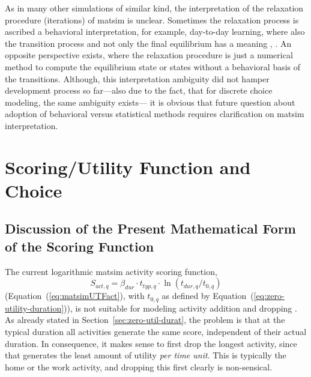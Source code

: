 As in many other simulations of similar kind, the interpretation of the relaxation procedure (iterations) of \gls{matsim} is unclear. 
%
Sometimes the relaxation process is ascribed a behavioral interpretation, for example, day-to-day learning, where also the transition process and not only the final equilibrium has a meaning \citep[][p.128]{LiuEtAl_TransResA_2006}, \citep[][p.523]{NagelBarrett1997feedback}. 
%
An opposite perspective exists, where the relaxation procedure is just a numerical method to compute the equilibrium state or states without a behavioral basis of the transitions.
%
Although, this interpretation ambiguity did not hamper development process so far---also due to the fact, that for discrete choice modeling, the same ambiguity exists---
it is obvious that future question about adoption of behavioral versus statistical methods 
requires clarification on \gls{matsim} interpretation.


\section{Scoring/Utility Function and Choice}
\label{sec:future-of-scoring-function}

\subsection{Discussion of the Present Mathematical Form of the Scoring Function}
\label{sec:discussion-present-math-form}

The current logarithmic \gls{matsim} activity scoring function,
\[
S_{act,q} = \beta_{dur} \cdot t_{typ,q} \cdot \ln(t_{dur,q}/t_{0,q}) 
\]
(\cf Equation~(\ref{eq:matsimUTFact}), with $t_{0,q}$ as defined by Equation~(\ref{eq:zero-utility-duration})), is not suitable for modeling activity
addition and dropping \citep[][p.127f]{Feil_PhDThesis_2010}. %
%
As already stated in Section~\ref{sec:zero-util-durat}, the problem is that 
at the typical duration all activities generate the same score, independent of their actual duration.  In consequence, it makes sense to first drop the longest activity, since that generates the least amount of utility \emph{per time unit}. This is typically the home or the work activity, and dropping this first clearly is non-sensical.

